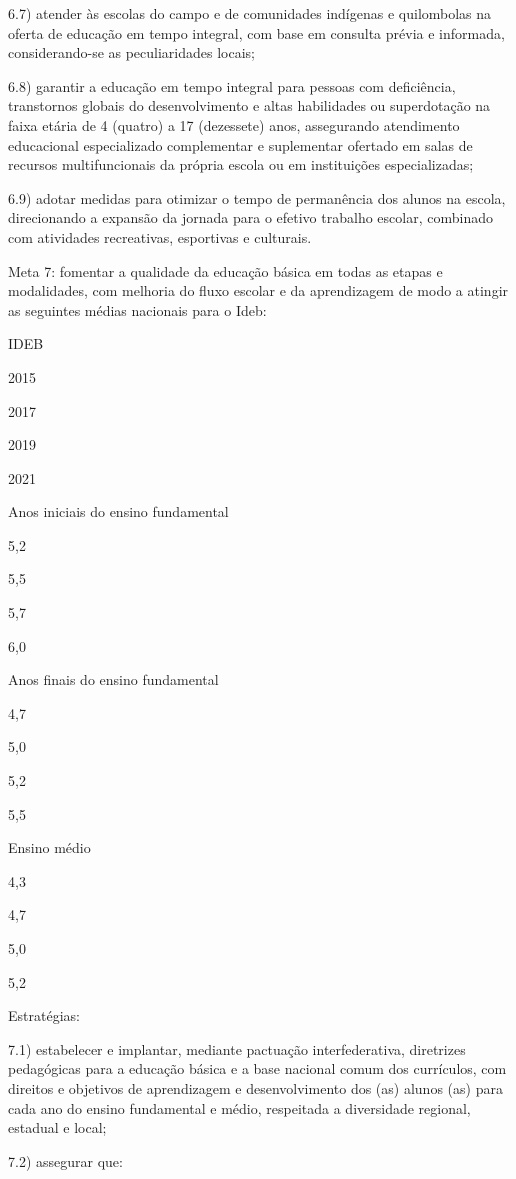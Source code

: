 \documentclass[
]{book}
\begin{document}
6.7) atender às escolas do campo e de comunidades indígenas e quilombolas na oferta de educação em tempo integral, com base em consulta prévia e informada, considerando-se as peculiaridades locais;

6.8) garantir a educação em tempo integral para pessoas com deficiência, transtornos globais do desenvolvimento e altas habilidades ou superdotação na faixa etária de 4 (quatro) a 17 (dezessete) anos, assegurando atendimento educacional especializado complementar e suplementar ofertado em salas de recursos multifuncionais da própria escola ou em instituições especializadas;

6.9) adotar medidas para otimizar o tempo de permanência dos alunos na escola, direcionando a expansão da jornada para o efetivo trabalho escolar, combinado com atividades recreativas, esportivas e culturais.

Meta 7: fomentar a qualidade da educação básica em todas as etapas e modalidades, com melhoria do fluxo escolar e da aprendizagem de modo a atingir as seguintes médias nacionais para o Ideb:

IDEB

2015

2017

2019

2021

Anos iniciais do ensino fundamental

5,2

5,5

5,7

6,0

Anos finais do ensino fundamental

4,7

5,0

5,2

5,5

Ensino médio

4,3

4,7

5,0

5,2

Estratégias:

7.1) estabelecer e implantar, mediante pactuação interfederativa, diretrizes pedagógicas para a educação básica e a base nacional comum dos currículos, com direitos e objetivos de aprendizagem e desenvolvimento dos (as) alunos (as) para cada ano do ensino fundamental e médio, respeitada a diversidade regional, estadual e local;

7.2) assegurar que:
\end{document}
